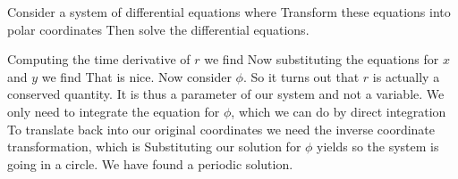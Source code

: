 Consider a system of differential equations where 
Transform these equations into polar coordinates 
Then solve the differential equations. 

\solution
Computing the time derivative of $r$ we find 
Now substituting the equations for $x$ and $y$ we find 
That is nice. Now consider $\phi$.
So it turns out that $r$ is actually a conserved quantity. It is thus a parameter of our system and not a variable. We only need to integrate the equation for $\phi$, which we can do by direct integration 
To translate back into our original coordinates we need the inverse coordinate transformation, which is 
Substituting our solution for $\phi$ yields
so the system is going in a circle. We have found a periodic solution. 
